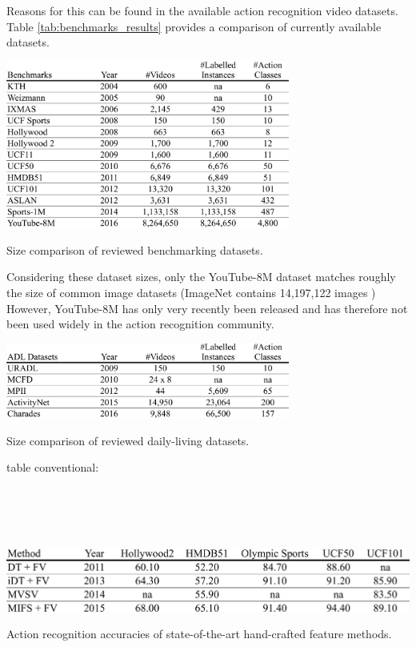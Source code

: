 Reasons for this can be found in the available action recognition video datasets.
Table \ref{tab:benchmarks_results} provides a comparison of currently available datasets.

\begin{table}[H]
    \centering
    \includegraphics[width=0.7\textwidth]{img_evaluation/benchmarks_results}
    \caption{Size comparison of reviewed benchmarking datasets.}
    \label{tab:benchmarks_results}
\end{table}

Considering these dataset sizes, only the YouTube-8M dataset matches roughly the size of common image datasets (ImageNet contains 14,197,122 images \cite{_imagenet_????})
However, YouTube-8M has only very recently been released and has therefore not been used widely in the action recognition community.




\begin{table}[H]
    \centering
    \includegraphics[width=0.7\textwidth]{img_evaluation/adl_results}
    \caption{Size comparison of reviewed daily-living datasets.}
    \label{tab:adl_results}
\end{table}

table conventional:\\
\cite{wang_action_2013}\\
\cite{wang_action_2013}\\
\cite{cai_multi-view_2014}\\
\cite{lan_beyond_2015}\\

\begin{table}[H]
    \centering
    \includegraphics[width=\textwidth]{img_evaluation/conventional_results}
    \caption{Action recognition accuracies of state-of-the-art hand-crafted feature methods.}
    \label{tab:conventional_results}
\end{table}


